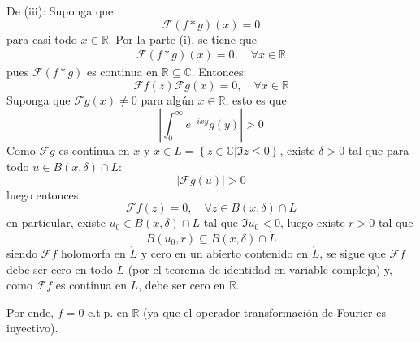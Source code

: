 \documentclass[12pt]{report}
\theoremstyle{largebreak}
\renewcommand{\leq}{\ensuremath{\leqslant}}
\newcommand\abs[1]{\ensuremath{\left|#1\right|}}
\newcommand{\fou}[1]{\ensuremath{\mathcal{F}#1}}
\begin{document}
\begin{sol}
        De (iii): Suponga que
        \begin{equation*}
            \fou{(f*g)}(x)=0
        \end{equation*}
        para casi todo $x\in\mathbb{R}$. Por la parte (i), se tiene que
        \begin{equation*}
            \begin{split}
                \fou{(f*g)}(x)=0,\quad\forall x\in\mathbb{R}
            \end{split}
        \end{equation*}
        pues $\fou{(f*g)}$ es continua en $\mathbb{R}\subseteq\mathbb{C}$. Entonces:
        \begin{equation*}
            \fou{f}(z)\fou{g}(x)=0,\quad\forall x\in\mathbb{R}
        \end{equation*}
        Suponga que $\fou{g}(x)\neq0$ para algún $x\in\mathbb{R}$, esto es que
        \begin{equation*}
            \abs{\int_{ 0}^\infty e^{ -ixy}g(y)}>0
        \end{equation*}
        Como $\fou{g}$ es continua en $x$ y $x\in L=\left\{z\in\mathbb{C}\Big|\Im z\leq0 \right\}$, existe $\delta>0$ tal que para todo $u\in B(x,\delta)\cap L$:
        \begin{equation*}
            \abs{\fou{g}(u)}>0
        \end{equation*}
        luego entonces
        \begin{equation*}
            \fou{f}(z)=0,\quad\forall z\in B(x,\delta)\cap L
        \end{equation*}
        en particular, existe $u_0\in B(x,\delta)\cap L$ tal que $\Im u_0<0$, luego existe $r>0$ tal que
        \begin{equation*}
            B(u_0,r)\subseteq B(x,\delta)\cap \mathring{L}
        \end{equation*}
        siendo $\fou{f}$ holomorfa en $\mathring{L}$ y cero en un abierto contenido en $\mathring{L}$, se sigue que $\fou{f}$ debe ser cero en todo $\mathring{L}$ (por el teorema de identidad en variable compleja) y, como $\fou{f}$ es continua en $L$, debe ser cero en $\mathbb{R}$.

        Por ende, $f=0$ c.t.p. en $\mathbb{R}$ (ya que el operador transformación de Fourier es inyectivo).
    \end{sol}
\end{document}
